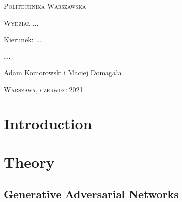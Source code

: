 \documentclass[12pt,a4paper,openany]{book}
\begin{document}
\begin{titlepage}
\begin{flushleft}
\end{flushleft}
\begin{center}
\textsc{{\huge Politechnika Warszawska}}
\end{center}
\bigskip
\bigskip
\begin{center}
\textsc{{\Large Wydział ...}}
\end{center}
\bigskip
\bigskip
\begin{center}
\begin{Large}
Kierunek: ...
\end{Large}
\end{center}
\bigskip
\bigskip
\noindent\hrulefill
\begin{center}
\textsc{\textbf{{\large ...
\\}}}
\bigskip
\bigskip

{\large 
Adam Komorowski i Maciej Domagała}

\end{center}
\noindent\hrulefill
\bigskip
\bigskip
\begin{center}
\end{center}
\bigskip
\bigskip
\bigskip
\bigskip
\begin{center}
{\textsc{\large Warszawa, czerwiec 2021
}}
\end{center}
\end{titlepage}

\tableofcontents

\chapter*{Introduction}

\chapter{Theory}

\section{Generative Adversarial Networks}

\end{document}
